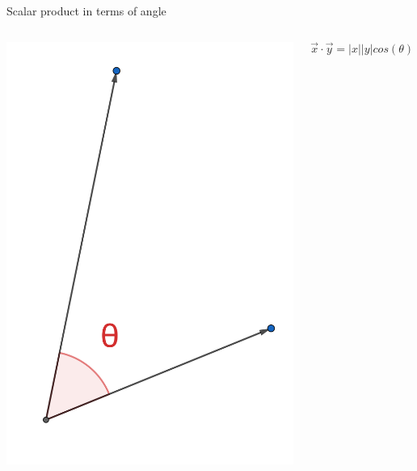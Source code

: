 \documentclass{beamer}
\begin{document}
\begin{frame}{Scalar product in terms of angle}
  \begin{columns}
    \includegraphics[scale=2]{angle.png}
    \begin{definition}
      \begin{equation*}
        \vec{x}\cdot\vec{y} = |x||y|cos(\theta)
      \end{equation*}
    \end{definition}
  \end{columns}
\end{frame}
\end{document}
